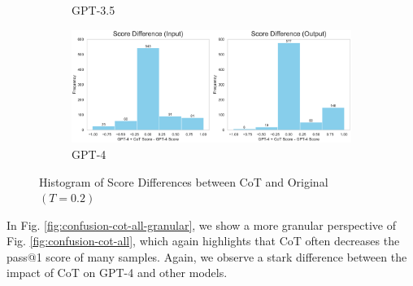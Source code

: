 \begin{figure}[H]
\begin{subfigure}[t]{0.49\textwidth}
         \caption{GPT-3.5}
     \end{subfigure}%
     \hfill
     \begin{subfigure}[t]{0.49\textwidth}
         \centering
         \includegraphics[width=\textwidth]{figs/confusion_cot/difference_histogram_gpt4_gpt4_cot.pdf}
         \caption{GPT-4}
         \label{fig:difference-hist-all-gpt4}
     \end{subfigure}
     \caption{Histogram of Score Differences between CoT and Original $(T=0.2)$}
     \label{fig:difference-hist-all}
\end{figure}

In Fig. \ref{fig:confusion-cot-all-granular}, we show a more granular perspective of Fig. \ref{fig:confusion-cot-all}, which again highlights that CoT often decreases the pass@1 score of many samples. Again, we observe a stark difference between the impact of CoT on GPT-4 and other models.

